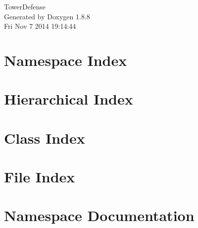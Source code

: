\documentclass[twoside]{book}
\newcommand{\+}{\discretionary{\mbox{\scriptsize$\hookleftarrow$}}{}{}}
\newcommand{\clearemptydoublepage}{%
  \newpage{\pagestyle{empty}\cleardoublepage}%
}
\begin{document}
\hypersetup{pageanchor=false,
             bookmarks=true,
             bookmarksnumbered=true,
             pdfencoding=unicode
            }
\begin{titlepage}
\vspace*{7cm}
\begin{center}%
{\Large Tower\+Defense }\\
\vspace*{1cm}
{\large Generated by Doxygen 1.8.8}\\
\vspace*{0.5cm}
{\small Fri Nov 7 2014 19:14:44}\\
\end{center}
\end{titlepage}
\clearemptydoublepage
\tableofcontents
\clearemptydoublepage
{}
\hypersetup{pageanchor=true}

\chapter{Namespace Index}

\chapter{Hierarchical Index}

\chapter{Class Index}

\chapter{File Index}

\chapter{Namespace Documentation}

\end{document}
